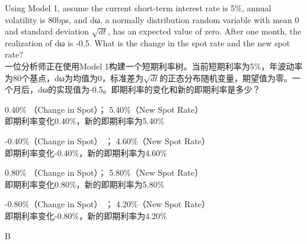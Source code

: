 \documentclass{article}
\newcounter{question} %
\begin{document}
\begin{question}
    Using Model 1, assume the current short-term interest rate is 5\%, annual volatility is 80bps, and dω, a normally distribution random variable with mean 0 and standard deviation $\sqrt{dt}$, has an expected value of zero. After one month, the realization of dω is -0.5. What is the change in the spot rate and the new spot rate?
    \\ 一位分析师正在使用Model 1构建一个短期利率树。当前短期利率为5\%，年波动率为80个基点，dω为均值为0，标准差为\(\sqrt{dt}\)的正态分布随机变量，期望值为零。一个月后，dω的实现值为-0.5。即期利率的变化和新的即期利率是多少？
\end{question}

\begin{choices}
    \item 0.40\% （Change in Spot）； 5.40\%（New Spot Rate）\\
    即期利率变化0.40\%，新的即期利率为5.40\%
    \item -0.40\%（Change in Spot） ； 4.60\%（New Spot Rate）\\
    即期利率变化-0.40\%，新的即期利率为4.60\%
    \item 0.80\% （Change in Spot）； 5.80\%（New Spot Rate）\\
    即期利率变化0.80\%，新的即期利率为5.80\%
    \item -0.80\%（Change in Spot） ； 4.20\%（New Spot Rate）\\
    即期利率变化-0.80\%，新的即期利率为4.20\%
\end{choices}

\begin{correctanswer}
    B
\end{correctanswer}
\end{document}
